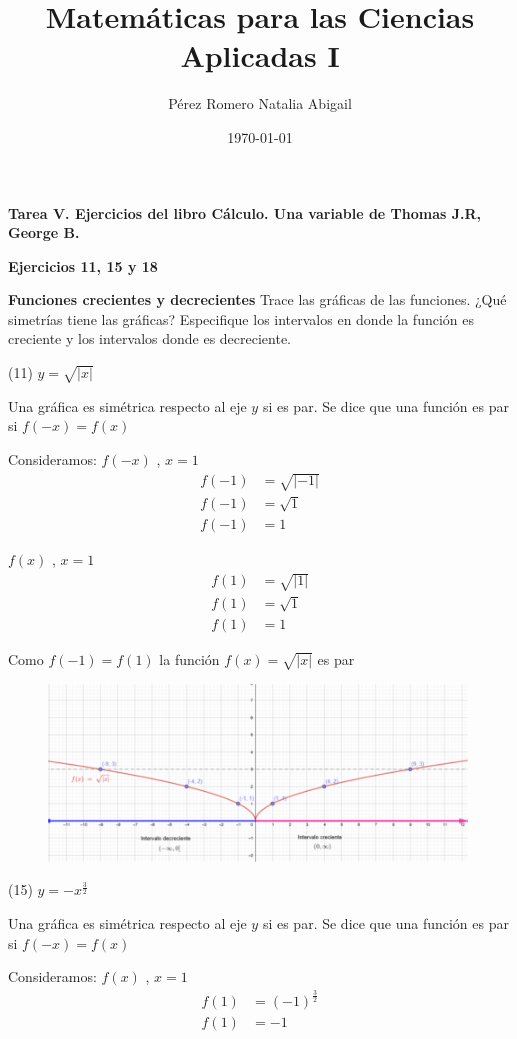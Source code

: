 \documentclass[12pt, letterpaper]{article}
\title{Matemáticas para las Ciencias Aplicadas I}
\author{Pérez Romero Natalia Abigail}
\date{\today}
\begin{document}
\maketitle
\textbf{Tarea V. Ejercicios del libro Cálculo. Una variable de Thomas J.R, George B.}

\textbf{Ejercicios 11, 15 y 18}

\textbf{Funciones crecientes y decrecientes}
Trace las gráficas de las funciones. ¿Qué simetrías tiene las gráficas? Especifique los intervalos en donde la función es creciente y los intervalos donde es decreciente.

(11) $y = \sqrt{|x|}$

Una gráfica es simétrica respecto al eje $y$ si es par. 
Se dice que una función es par si $f(-x)=f(x)$

Consideramos: 
$f(-x)$ , $x = 1$
\begin{align*}
	f(-1) &=  \sqrt{|-1|}\\
	f(-1) &= \sqrt{1}\\
	f(-1) &= 1
\end{align*}

$f(x)$ , $x = 1$
\begin{align*}
	f(1) &=  \sqrt{|1|}\\
	f(1) &= \sqrt{1}\\
	f(1) &= 1
\end{align*}

Como $f(-1)= f(1)$ la función $f(x) = \sqrt{|x|}$ es par

\begin{figure}[h]
\centering
\includegraphics[width=30em]{creceuno}
\end{figure}

\newpage

(15) $y= -x^{\frac{3}{2}}$

Una gráfica es simétrica respecto al eje $y$ si es par. 
Se dice que una función es par si $f(-x)=f(x)$

Consideramos: $f(x)$ , $x = 1$
\begin{align*}
	f(1) &=  (-1)^{\frac{3}{2}}\\
	f(1) &= -1
\end{align*}
\end{document}
